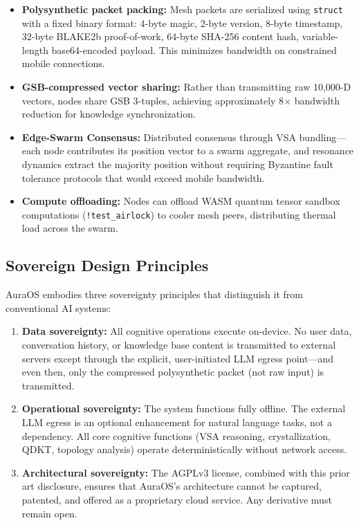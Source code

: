 \documentclass[11pt]{article}
\begin{document}
\begin{itemize}
    \item \textbf{Polysynthetic packet packing:} Mesh packets are serialized using \texttt{struct} with a fixed binary format: 4-byte magic, 2-byte version, 8-byte timestamp, 32-byte BLAKE2b proof-of-work, 64-byte SHA-256 content hash, variable-length base64-encoded payload. This minimizes bandwidth on constrained mobile connections.
    \item \textbf{GSB-compressed vector sharing:} Rather than transmitting raw 10,000-D vectors, nodes share GSB 3-tuples, achieving approximately 8$\times$ bandwidth reduction for knowledge synchronization.
    \item \textbf{Edge-Swarm Consensus:} Distributed consensus through VSA bundling—each node contributes its position vector to a swarm aggregate, and resonance dynamics extract the majority position without requiring Byzantine fault tolerance protocols that would exceed mobile bandwidth.
    \item \textbf{Compute offloading:} Nodes can offload WASM quantum tensor sandbox computations (\texttt{!test\_airlock}) to cooler mesh peers, distributing thermal load across the swarm.
\end{itemize}

\subsection{Sovereign Design Principles}

AuraOS embodies three sovereignty principles that distinguish it from conventional AI systems:

\begin{enumerate}[label=(\arabic*)]
    \item \textbf{Data sovereignty:} All cognitive operations execute on-device. No user data, conversation history, or knowledge base content is transmitted to external servers except through the explicit, user-initiated LLM egress point—and even then, only the compressed polysynthetic packet (not raw input) is transmitted.
    \item \textbf{Operational sovereignty:} The system functions fully offline. The external LLM egress is an optional enhancement for natural language tasks, not a dependency. All core cognitive functions (VSA reasoning, crystallization, QDKT, topology analysis) operate deterministically without network access.
    \item \textbf{Architectural sovereignty:} The AGPLv3 license, combined with this prior art disclosure, ensures that AuraOS's architecture cannot be captured, patented, and offered as a proprietary cloud service. Any derivative must remain open.
\end{enumerate}
\end{document}

